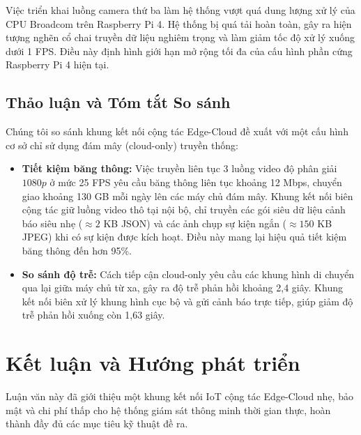 \documentclass[12pt,a4paper]{article}
\begin{document}
Việc triển khai luồng camera thứ ba làm hệ thống vượt quá dung lượng xử lý của CPU Broadcom trên Raspberry Pi 4. Hệ thống bị quá tải hoàn toàn, gây ra hiện tượng nghẽn cổ chai truyền dữ liệu nghiêm trọng và làm giảm tốc độ xử lý xuống dưới 1 FPS. Điều này định hình giới hạn mở rộng tối đa của cấu hình phần cứng Raspberry Pi 4 hiện tại.

\subsection{Thảo luận và Tóm tắt So sánh}
Chúng tôi so sánh khung kết nối cộng tác Edge-Cloud đề xuất với một cấu hình cơ sở chỉ sử dụng đám mây (cloud-only) truyền thống:
\begin{itemize}
    \item \textbf{Tiết kiệm băng thông:} Việc truyền liên tục 3 luồng video độ phân giải $1080p$ ở mức 25 FPS yêu cầu băng thông liên tục khoảng 12 Mbps, chuyển giao khoảng 130 GB mỗi ngày lên các máy chủ đám mây. Khung kết nối biên cộng tác giữ luồng video thô tại nội bộ, chỉ truyền các gói siêu dữ liệu cảnh báo siêu nhẹ ($\approx 2$ KB JSON) và các ảnh chụp sự kiện ngắn ($\approx 150$ KB JPEG) khi có sự kiện được kích hoạt. Điều này mang lại hiệu quả tiết kiệm băng thông đến hơn 95\%.
    \item \textbf{So sánh độ trễ:} Cách tiếp cận cloud-only yêu cầu các khung hình di chuyển qua lại giữa máy chủ từ xa, gây ra độ trễ phản hồi khoảng 2,4 giây. Khung kết nối biên xử lý khung hình cục bộ và gửi cảnh báo trực tiếp, giúp giảm độ trễ phản hồi xuống còn 1,63 giây.
\end{itemize}

\newpage

\section{Kết luận và Hướng phát triển}

Luận văn này đã giới thiệu một khung kết nối IoT cộng tác Edge-Cloud nhẹ, bảo mật và chi phí thấp cho hệ thống giám sát thông minh thời gian thực, hoàn thành đầy đủ các mục tiêu kỹ thuật đề ra.
\end{document}
